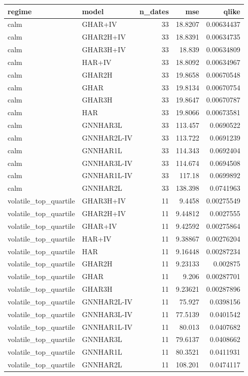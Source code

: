 \begin{tabular}{llrrr}
\toprule
regime & model & n_dates & mse & qlike \\
\midrule
calm & GHAR+IV & 33 & 18.8207 & 0.00634437 \\
calm & GHAR2H+IV & 33 & 18.8391 & 0.00634735 \\
calm & GHAR3H+IV & 33 & 18.839 & 0.00634809 \\
calm & HAR+IV & 33 & 18.8092 & 0.00634967 \\
calm & GHAR2H & 33 & 19.8658 & 0.00670548 \\
calm & GHAR & 33 & 19.8134 & 0.00670754 \\
calm & GHAR3H & 33 & 19.8647 & 0.00670787 \\
calm & HAR & 33 & 19.8066 & 0.00673581 \\
calm & GNNHAR3L & 33 & 113.457 & 0.0690522 \\
calm & GNNHAR2L-IV & 33 & 113.722 & 0.0691239 \\
calm & GNNHAR1L & 33 & 114.343 & 0.0692404 \\
calm & GNNHAR3L-IV & 33 & 114.674 & 0.0694508 \\
calm & GNNHAR1L-IV & 33 & 117.18 & 0.0699892 \\
calm & GNNHAR2L & 33 & 138.398 & 0.0741963 \\
volatile_top_quartile & GHAR3H+IV & 11 & 9.4458 & 0.00275549 \\
volatile_top_quartile & GHAR2H+IV & 11 & 9.44812 & 0.0027555 \\
volatile_top_quartile & GHAR+IV & 11 & 9.42592 & 0.00275864 \\
volatile_top_quartile & HAR+IV & 11 & 9.38867 & 0.00276204 \\
volatile_top_quartile & HAR & 11 & 9.16448 & 0.00287234 \\
volatile_top_quartile & GHAR2H & 11 & 9.23133 & 0.002875 \\
volatile_top_quartile & GHAR & 11 & 9.206 & 0.00287701 \\
volatile_top_quartile & GHAR3H & 11 & 9.23621 & 0.00287896 \\
volatile_top_quartile & GNNHAR2L-IV & 11 & 75.927 & 0.0398156 \\
volatile_top_quartile & GNNHAR3L-IV & 11 & 77.5139 & 0.0401542 \\
volatile_top_quartile & GNNHAR1L-IV & 11 & 80.013 & 0.0407682 \\
volatile_top_quartile & GNNHAR3L & 11 & 79.6137 & 0.0408662 \\
volatile_top_quartile & GNNHAR1L & 11 & 80.3521 & 0.0411931 \\
volatile_top_quartile & GNNHAR2L & 11 & 108.201 & 0.0474117 \\
\bottomrule
\end{tabular}
